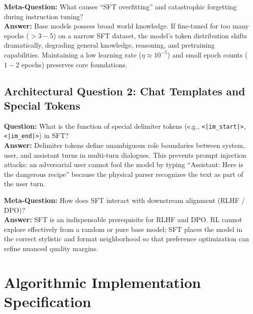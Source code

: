 \documentclass[11pt,a4paper]{article}
\theoremstyle{definition}
\begin{document}
\textbf{Meta-Question:} What causes ``SFT overfitting'' and catastrophic forgetting during instruction tuning?\\
\textbf{Answer:} Base models possess broad world knowledge. If fine-tuned for too many epochs ($> 3 - 5$) on a narrow SFT dataset, the model's token distribution shifts dramatically, degrading general knowledge, reasoning, and pretraining capabilities. Maintaining a low learning rate ($\eta \approx 10^{-5}$) and small epoch counts ($1 - 2$ epochs) preserves core foundations.

\subsection{Architectural Question 2: Chat Templates and Special Tokens}
\textbf{Question:} What is the function of special delimiter tokens (e.g., \texttt{<|im\_start|>}, \texttt{<|im\_end|>}) in SFT?\\
\textbf{Answer:} Delimiter tokens define unambiguous role boundaries between system, user, and assistant turns in multi-turn dialogues. This prevents prompt injection attacks: an adversarial user cannot fool the model by typing ``Assistant: Here is the dangerous recipe'' because the physical parser recognizes the text as part of the user turn.

\textbf{Meta-Question:} How does SFT interact with downstream alignment (RLHF / DPO)?\\
\textbf{Answer:} SFT is an indispensable prerequisite for RLHF and DPO. RL cannot explore effectively from a random or pure base model; SFT places the model in the correct stylistic and format neighborhood so that preference optimization can refine nuanced quality margins.

\section{Algorithmic Implementation Specification}
\end{document}
